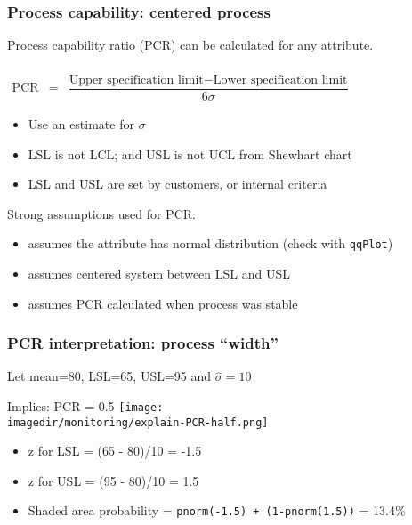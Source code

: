 \begin{frame}\frametitle{Process capability: centered process}
	
	Process capability ratio (PCR) can be calculated for any attribute.
	
	$ 
	\begin{array}{rcl}
		\\
		\text{PCR} &=& \dfrac{\text{Upper specification limit} - \text{Lower specification limit}}{6\sigma} 
	\end{array}
	$
	\begin{itemize}
		\item	Use an estimate for $\sigma$ 
		\item	LSL is not LCL; and USL is not UCL from Shewhart chart 
		\item	LSL and USL are set by customers, or internal criteria 
	\end{itemize}
	
	Strong assumptions used for PCR: 
	\begin{itemize}
		\item	assumes the attribute has normal distribution (check with \texttt{qqPlot}) 
		\item	assumes centered system between LSL and USL 
		\item	assumes PCR calculated when process was stable 
	\end{itemize}
\end{frame}

\begin{frame}\frametitle{PCR interpretation: process ``width''}
	
	Let mean=80, LSL=65, USL=95 and $\hat{\sigma} = 10$
	
	Implies: PCR = 0.5 
	\texttt{[image: \\imagedir/monitoring/explain-PCR-half.png]}
	\begin{itemize}
		\item	z for LSL = (65 - 80)/10 = -1.5 
		\item	z for USL = (95 - 80)/10 = 1.5 
		\item	Shaded area probability = \texttt{pnorm(-1.5) + (1-pnorm(1.5))} = 13.4\% 
	\end{itemize}
\end{frame}

